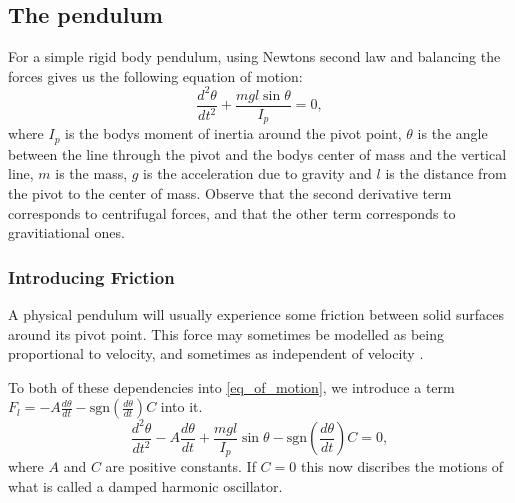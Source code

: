 \documentclass[11pt, a4paper]{article}
\begin{document}
\subsection{The pendulum}
For a simple rigid body pendulum, using Newtons second law and balancing the
forces gives us the following
equation of motion:
\begin{equation}
  \frac{d^2\theta}{dt^2} + \frac{mgl\sin{\theta}}{I_p} = 0,
  \label{eq_of_motion}
\end{equation}
where $I_p$ is the bodys moment of inertia around the pivot point, $\theta$ is the
angle between the line through the pivot and the bodys center of mass and the
vertical line, $m$ is the mass, $g$ is the acceleration due to gravity and
$l$ is the distance from the pivot to the center of mass. 
Observe that the second derivative term corresponds to centrifugal forces, and
that the other term corresponds to gravitiational ones.




\subsubsection{Introducing Friction}
A physical pendulum will usually experience some friction between solid
surfaces around its pivot point.
This force may sometimes be modelled as being proportional to velocity\cite[p. 30]{book},
and sometimes as independent of velocity \cite{friction}.

To both of these dependencies into \ref{eq_of_motion}, 
we introduce a term $F_l = -A \frac{d\theta}{dt} - \text{sgn}\left(\frac{d\theta}{dt}\right)C$ into it. 
\begin{equation}
    \frac{d^2\theta}{dt^2} 
  - A \frac{d\theta}{dt}
  + \frac{mgl}{I_p}\sin{\theta} 
  - \text{sgn}(\frac{d\theta}{dt})C 
  = 0,
  \label{eq_of_motion_comp1}
\end{equation}
where $A$ and $C$ are positive constants.
If $C = 0$ this now discribes the motions of what is 
called a damped harmonic oscillator\cite{osc}.
\end{document}
